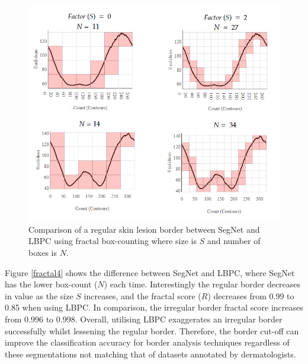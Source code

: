 \documentclass[10.5pt]{report}
\begin{document}
\begin{figure}
\centering

\includegraphics[scale=0.9]{lbpcvseg2.png}

\caption{Comparison of a regular skin lesion border between SegNet and LBPC using fractal box-counting where size is $S$ and number of boxes is $N$.} \label{fractal3}
\end{figure}

Figure \ref{fractal4} shows the difference between SegNet and LBPC, where SegNet has the lower box-count ($N$) each time. Interestingly the regular border decreases in value as the size $S$ increases, and the fractal score ($R$) decreases from 0.99 to 0.85 when using LBPC. In comparison, the irregular border fractal score increases from 0.996 to 0.998. Overall, utilising LBPC exaggerates an irregular border successfully whilst lessening the regular border. Therefore, the border cut-off can improve the classification accuracy for border analysis techniques regardless of these segmentations not matching that of datasets annotated by dermatologists. 
\end{document}

